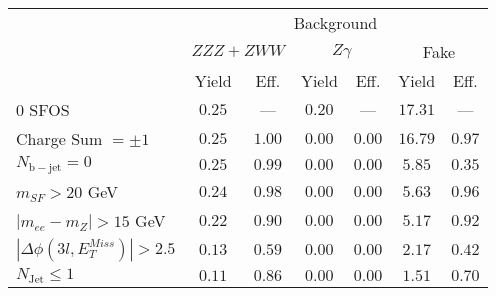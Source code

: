 \begin{tabular}{l||c|c||c|c||c|c}
\hline
 &  \multicolumn{6}{c}{Background} \\
 & \multicolumn{2}{c||}{$ZZZ+ZWW$} & \multicolumn{2}{c||}{$Z\gamma$} & \multicolumn{2}{c}{Fake}  \\ 
 & Yield & Eff. & Yield & Eff. & Yield & Eff. \\
\hline\hline
0 SFOS &  $0.25$ &  --- &  $0.20$ &  --- &  $17.31$ &  --- \\ 
\hline
Charge Sum $= \pm 1$ &  $0.25$ &  $1.00$ &  $0.00$ &  $0.00$ &  $16.79$ &  $0.97$ \\ 
\hline
$N_{\mathrm{b-jet}} = 0$ &$0.25$ &  $0.99$ &  $0.00$ &  $0.00$ &  $5.85$ &  $0.35$ \\ 
\hline
$m_{SF} > 20$ GeV &$0.24$ &  $0.98$ &  $0.00$ &  $0.00$ &  $5.63$ &  $0.96$ \\ 
\hline
$|m_{ee} - m_{Z}| > 15$ GeV &$0.22$ &  $0.90$ &  $0.00$ &  $0.00$ &  $5.17$ &  $0.92$ \\ 
\hline
$|\Delta\phi(3l,E_{T}^{Miss})| > 2.5$ &$0.13$ &  $0.59$ &  $0.00$ &  $0.00$ &  $2.17$ &  $0.42$ \\ 
\hline
$N_{\mathrm{Jet}} \leq 1$ &$0.11$ &  $0.86$ &  $0.00$ &  $0.00$ &  $1.51$ &  $0.70$ \\ 
\hline
\end{tabular}



